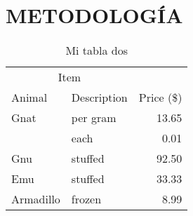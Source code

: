 \chapter{METODOLOGÍA}

\lipsum[1-1] \parencite{latex2e}

\begin{table}[H]
    \centering
    \begin{tabular}{@{}llr@{}}
        \toprule
        \multicolumn{2}{c}{Item} &                          \\ \cmidrule(r){1-2}
        Animal                   & Description & Price (\$) \\ \midrule
        Gnat                     & per gram    & 13.65      \\
                                 & each        & 0.01       \\
        Gnu                      & stuffed     & 92.50      \\
        Emu                      & stuffed     & 33.33      \\
        Armadillo                & frozen      & 8.99       \\ \bottomrule
    \end{tabular}
    \caption{Mi tabla dos}
    \label{tab:tabla2}
\end{table}
